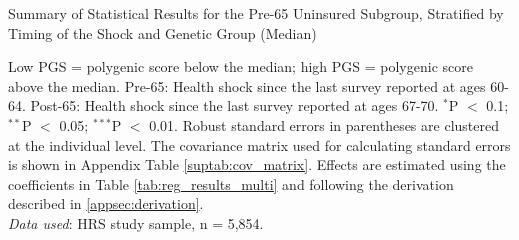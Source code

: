 \begin{table}[!ht]
	\caption{Summary of Statistical Results for the Pre-65 Uninsured Subgroup, Stratified by Timing of the Shock and Genetic Group (Median)}
	\label{tab:3pgs}
	
		\begin{flushleft}
			Low PGS = polygenic score below the median; high PGS = polygenic score above the median.
			Pre-65: Health shock since the last survey reported at ages 60-64.
			Post-65: Health shock since the last survey reported at ages 67-70.
			$^{*}$P $<$ 0.1; $^{**}$P $<$ 0.05; $^{***}$P $<$ 0.01. Robust standard errors in parentheses are clustered at the individual level.
			The covariance matrix used for calculating standard errors is shown in Appendix Table \ref{suptab:cov_matrix}.
			Effects are estimated using the coefficients in Table \ref{tab:reg_results_multi} and following the derivation described in \ref{appsec:derivation}.\\
			\textit{Data used}: HRS study sample, n = 5,854.
		\end{flushleft}
\end{table}


